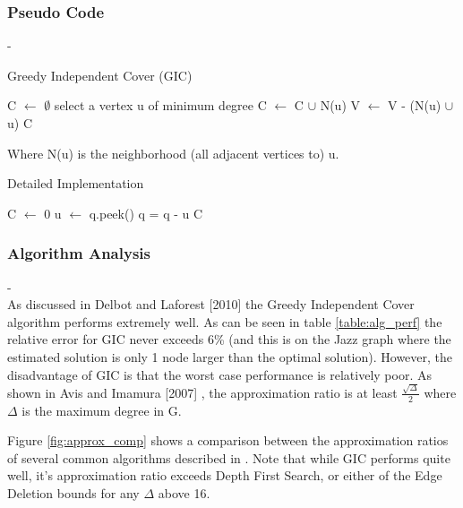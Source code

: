 \documentclass[acmlarge]{acmart}
\begin{document}
\subsubsection{Pseudo Code}

-\\

\begin{algorithm}[H]
	\caption{Greedy Independent Cover (GIC)}
	\SetAlgoLined
	C $\leftarrow$ $\emptyset$\;
	{
		select a vertex u of minimum degree\;
		C $\leftarrow$ C $\cup$ N(u)\;
		V $\leftarrow$ V - (N(u) $\cup$ {u})\;
	}
	\Return C\;
\end{algorithm}

Where N(u) is the neighborhood (all adjacent vertices to) u.\\

\begin{algorithm}[H]
	\caption{Detailed Implementation}
	\SetAlgoLined
	C $\leftarrow$ 0\;
	{
		u $\leftarrow$ q.peek()\;
		q = q - u\;
	}
	\Return C\;
\end{algorithm}

\subsubsection{Algorithm Analysis}\label{app_alg_analy}

-\\

As discussed in Delbot and Laforest [2010] \cite{Fran10} the Greedy Independent Cover algorithm performs extremely well. As can be seen in table \ref{table:alg_perf} the relative error for GIC never exceeds 6\% (and this is on the Jazz graph where the estimated solution is only 1 node larger than the optimal solution). However, the disadvantage of GIC is that the worst case performance is relatively poor. As shown in Avis and Imamura [2007] \cite{Avis06}, the approximation ratio is at least $\frac{\sqrt{\Delta}}{2}$ where $\Delta$ is the maximum degree in G.

Figure \ref{fig:approx_comp} shows a comparison between the approximation ratios of several common algorithms described in \cite{Fran10}. Note that while GIC performs quite well, it's approximation ratio exceeds Depth First Search, or either of the Edge Deletion bounds for any $\Delta$ above 16.
\end{document}
